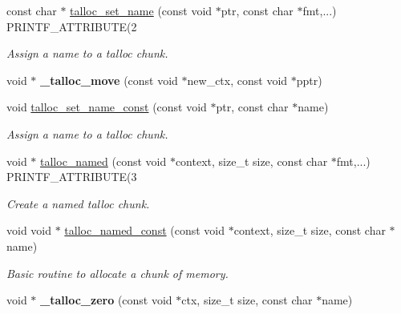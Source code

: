 \begin{DoxyCompactItemize}
\item 
const char $\ast$ \hyperlink{group__talloc_ga75097bd7d060a95d42f76cf41bffa207}{talloc\+\_\+set\+\_\+name} (const void $\ast$ptr, const char $\ast$fmt,...) P\+R\+I\+N\+T\+F\+\_\+\+A\+T\+T\+R\+I\+B\+U\+T\+E(2
\begin{DoxyCompactList}\small\item\em Assign a name to a talloc chunk. \end{DoxyCompactList}\item 
\hypertarget{group__talloc_ga5a91eb0e4c97eb636b8bbc3bcb5ec540}{}void $\ast$ {\bfseries \+\_\+talloc\+\_\+move} (const void $\ast$new\+\_\+ctx, const void $\ast$pptr)\label{group__talloc_ga5a91eb0e4c97eb636b8bbc3bcb5ec540}

\item 
void \hyperlink{group__talloc_ga204ed205d6b1524c46f12541d5eca686}{talloc\+\_\+set\+\_\+name\+\_\+const} (const void $\ast$ptr, const char $\ast$name)
\begin{DoxyCompactList}\small\item\em Assign a name to a talloc chunk. \end{DoxyCompactList}\item 
void $\ast$ \hyperlink{group__talloc_ga8bd5a797d207c4e04799105c065c46be}{talloc\+\_\+named} (const void $\ast$context, size\+\_\+t size, const char $\ast$fmt,...) P\+R\+I\+N\+T\+F\+\_\+\+A\+T\+T\+R\+I\+B\+U\+T\+E(3
\begin{DoxyCompactList}\small\item\em Create a named talloc chunk. \end{DoxyCompactList}\item 
void void $\ast$ \hyperlink{group__talloc_ga72dc3f21af6c125c71221860c5d9fd36}{talloc\+\_\+named\+\_\+const} (const void $\ast$context, size\+\_\+t size, const char $\ast$name)
\begin{DoxyCompactList}\small\item\em Basic routine to allocate a chunk of memory. \end{DoxyCompactList}\item 
\hypertarget{group__talloc_ga5df9c4bfbb03458a2f22b45e6a69de3a}{}void $\ast$ {\bfseries \+\_\+talloc\+\_\+zero} (const void $\ast$ctx, size\+\_\+t size, const char $\ast$name)\label{group__talloc_ga5df9c4bfbb03458a2f22b45e6a69de3a}


\end{DoxyCompactItemize}
